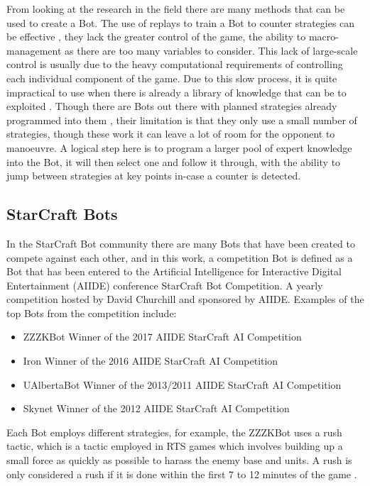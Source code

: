 \documentclass[journal]{IEEEtran}
\begin{document}
	From looking at the research in the field there are many methods that can be used to create a Bot. The use of replays to train a Bot to counter strategies can be effective \cite{Bayesian}, they lack the greater control of the game, the ability to macro-management as there are too many variables to consider. This lack of large-scale control is usually due to the heavy computational requirements of controlling each individual component of the game.  Due to this slow process, it is quite impractical to use when there is already a library of knowledge that can be to exploited \cite{Liquid}. Though there are Bots out there with planned strategies already programmed into them \cite{ZZZK,Fuzzy}, their limitation is that they only use a small number of strategies, though these work it can leave a lot of room for the opponent to manoeuvre. A logical step here is to program a larger pool of expert knowledge into the Bot, it will then select one and follow it through, with the ability to jump between strategies at key points in-case a counter is detected. 
	
	\subsection{StarCraft Bots}
	In the StarCraft Bot community there are many Bots that have been created to compete against each other, and in this work, a competition Bot is defined as a Bot that has been entered to the Artificial Intelligence for Interactive Digital Entertainment (AIIDE) conference StarCraft Bot Competition. A yearly competition hosted by David Churchill and sponsored by AIIDE. Examples of the top Bots from the competition include:
	\begin{itemize}
		\item ZZZKBot Winner of the 2017 AIIDE StarCraft AI Competition \cite{ZZZK} 
		\item Iron Winner of the 2016 AIIDE StarCraft AI Competition \cite{Iron}
		\item UAlbertaBot Winner of the 2013/2011 AIIDE StarCraft AI Competition \cite{UAlberta}
		\item Skynet Winner of the 2012 AIIDE StarCraft AI Competition \cite{Skynet}
	\end{itemize}
	
	Each Bot employs different strategies, for example, the ZZZKBot uses a rush tactic, which is a tactic employed in RTS games which involves building up a small force as quickly as possible to harass the enemy base and units. A rush is only considered a rush if it is done within the first 7 to 12 minutes of the game \cite{Liqui}.
	
\end{document}
